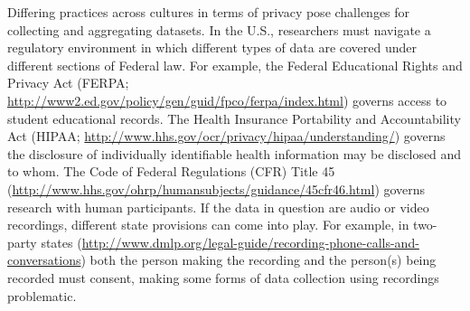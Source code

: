 \documentclass[letterpaper,man,apacite,natbib]{apa6}
\begin{document}
Differing practices across cultures in terms of privacy pose challenges for collecting and aggregating datasets.
In the U.S., researchers must navigate a regulatory environment in which different types of data are covered under different sections of Federal law.
For example, the Federal Educational Rights and Privacy Act (FERPA; \url{http://www2.ed.gov/policy/gen/guid/fpco/ferpa/index.html}) governs access to student educational records.
The Health Insurance Portability and Accountability Act (HIPAA; \url{http://www.hhs.gov/ocr/privacy/hipaa/understanding/}) governs the disclosure of individually identifiable health information may be disclosed and to whom.
The Code of Federal Regulations (CFR) Title 45 (\url{http://www.hhs.gov/ohrp/humansubjects/guidance/45cfr46.html}) governs research with human participants.
If the data in question are audio or video recordings, different state provisions can come into play.
For example, in two-party states (\url{http://www.dmlp.org/legal-guide/recording-phone-calls-and-conversations}) both the person making the recording and the person(s) being recorded must consent, making some forms of data collection using recordings problematic.
\end{document}
